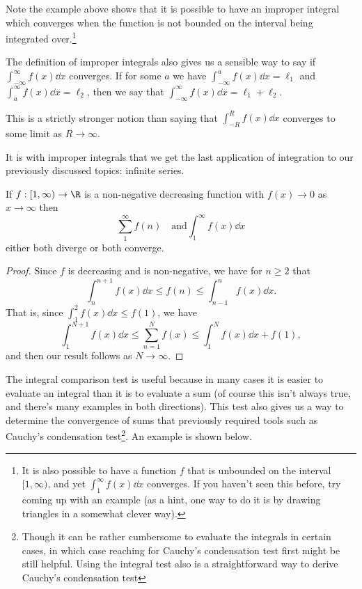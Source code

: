 \documentclass[a4paper]{scrartcl}
\begin{document}
Note the example above shows that it is possible to have an improper integral which converges when the function is not bounded on the interval being integrated over.\footnote{It is also possible to have a function $f$ that is unbounded on the interval $[1, \infty)$, and yet $\int_1^{\infty} f(x) \dd x$ converges. If you haven't seen this before, try coming up with an example (as a hint, one way to do it is by drawing triangles in a somewhat clever way).} 

The definition of improper integrals also gives us a sensible way to say if $\int_{-\infty}^{\infty} f(x) \dd x$ converges. If for some $a$ we have $\int_{-\infty}^{a} f(x) \dd x = \ell_1$ and $\int_{a}^{\infty} f(x) \dd x = \ell_2$, then we say that $\int_{-\infty}^{\infty} f(x) \dd x = \ell_1 + \ell_2$.

\begin{remark}[Warning]
	This is a strictly stronger notion than saying that $\int_{-R}^{R} f(x) \dd x$ converges to some limit as $R \rightarrow \infty$.
\end{remark}

It is with improper integrals that we get the last application of integration to our previously discussed topics: infinite series. 

\begin{theorem}
	If $f:[1, \infty) \rightarrow \R$ is a non-negative decreasing function with $f(x) \rightarrow 0$ as $x \rightarrow \infty$ then
	$$
	\sum_1^{\infty} f(n) \quad \text{and} \int_1^{\infty} f(x) \dd x
	$$
	either both diverge or both converge.
\end{theorem}
\begin{proof}
	Since $f$ is decreasing and is non-negative, we have for $n \geq 2$ that
	$$
	\int_n^{n + 1} f(x) \dd x \leq f(n) \leq \int_{n - 1}^n f(x) \dd x.
	$$
	That is, since $\int_1^2 f(x) \dd x \leq f(1)$, we have
	$$
	\int_1^{N + 1} f(x) \dd x \leq \sum_{n= 1}^N f(x) \leq \int_1^N f(x) \dd x + f(1),
	$$
	and then our result follows as $N \rightarrow \infty$.
\end{proof}

The integral comparison test is useful because in many cases it is easier to evaluate an integral than it is to evaluate a sum (of course this isn't always true, and there's many examples in both directions). This test also gives us a way to determine the convergence of sums that previously required tools such as Cauchy's condensation test\footnote{Though it can be rather cumbersome to evaluate the integrals in certain cases, in which case reaching for Cauchy's condensation test first might be still helpful. Using the integral test also is a straightforward way to derive Cauchy's condensation test}. An example is shown below.
\end{document}
